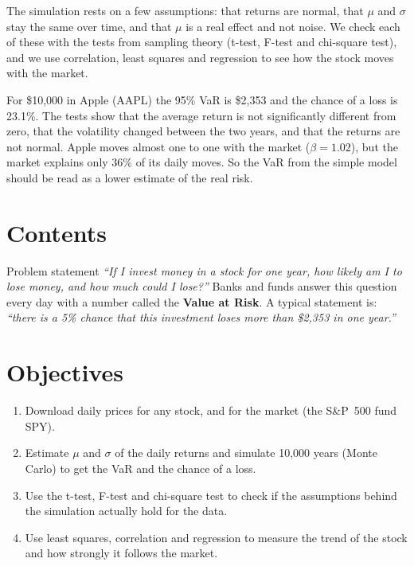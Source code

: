 \documentclass[10pt,a4paper,openany,oneside]{book}
\begin{document}
The simulation rests on a few assumptions: that returns are normal, that $\mu$ and
$\sigma$ stay the same over time, and that $\mu$ is a real effect and not noise. We check
each of these with the tests from sampling theory (t-test, F-test and chi-square test), and
we use correlation, least squares and regression to see how the stock moves with the
market.

For \$10{,}000 in Apple (AAPL) the 95\% VaR is \$2{,}353 and the chance of a loss is
23.1\%. The tests show that the average return is not significantly different from zero,
that the volatility changed between the two years, and that the returns are not normal.
Apple moves almost one to one with the market ($\beta = 1.02$), but the market explains
only 36\% of its daily moves. So the VaR from the simple model should be read as a lower
estimate of the real risk.

\vspace{-1em}
\begingroup
\renewcommand{\chapter}[2]{\section*{Contents}}
\tableofcontents
\endgroup

\chapter{Introduction}

\section{Problem statement}
\emph{``If I invest money in a stock for one year, how likely am I to lose money, and how
much could I lose?''}
Banks and funds answer this question every day with a number called the \textbf{Value at
Risk}. A typical statement is: \emph{``there is a 5\% chance that this investment loses
more than \$2{,}353 in one year.''}

\section{Objectives}
\begin{enumerate}
  \item Download daily prices for any stock, and for the market (the S\&P~500 fund SPY).
  \item Estimate $\mu$ and $\sigma$ of the daily returns and simulate 10{,}000 years
    (Monte Carlo) to get the VaR and the chance of a loss.
  \item Use the t-test, F-test and chi-square test to check if the assumptions behind the
    simulation actually hold for the data.
  \item Use least squares, correlation and regression to measure the trend of the stock
    and how strongly it follows the market.
\end{enumerate}
\end{document}
